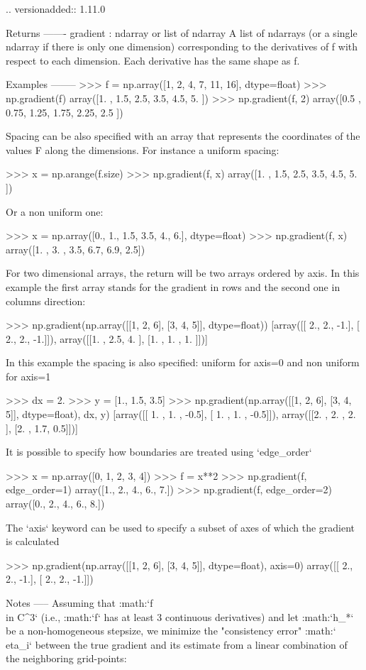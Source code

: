 \begin{DoxyVerb}
    .. versionadded:: 1.11.0

Returns
-------
gradient : ndarray or list of ndarray
    A list of ndarrays (or a single ndarray if there is only one dimension)
    corresponding to the derivatives of f with respect to each dimension.
    Each derivative has the same shape as f.

Examples
--------
>>> f = np.array([1, 2, 4, 7, 11, 16], dtype=float)
>>> np.gradient(f)
array([1. , 1.5, 2.5, 3.5, 4.5, 5. ])
>>> np.gradient(f, 2)
array([0.5 ,  0.75,  1.25,  1.75,  2.25,  2.5 ])

Spacing can be also specified with an array that represents the coordinates
of the values F along the dimensions.
For instance a uniform spacing:

>>> x = np.arange(f.size)
>>> np.gradient(f, x)
array([1. ,  1.5,  2.5,  3.5,  4.5,  5. ])

Or a non uniform one:

>>> x = np.array([0., 1., 1.5, 3.5, 4., 6.], dtype=float)
>>> np.gradient(f, x)
array([1. ,  3. ,  3.5,  6.7,  6.9,  2.5])

For two dimensional arrays, the return will be two arrays ordered by
axis. In this example the first array stands for the gradient in
rows and the second one in columns direction:

>>> np.gradient(np.array([[1, 2, 6], [3, 4, 5]], dtype=float))
[array([[ 2.,  2., -1.],
       [ 2.,  2., -1.]]), array([[1. , 2.5, 4. ],
       [1. , 1. , 1. ]])]

In this example the spacing is also specified:
uniform for axis=0 and non uniform for axis=1

>>> dx = 2.
>>> y = [1., 1.5, 3.5]
>>> np.gradient(np.array([[1, 2, 6], [3, 4, 5]], dtype=float), dx, y)
[array([[ 1. ,  1. , -0.5],
       [ 1. ,  1. , -0.5]]), array([[2. , 2. , 2. ],
       [2. , 1.7, 0.5]])]

It is possible to specify how boundaries are treated using `edge_order`

>>> x = np.array([0, 1, 2, 3, 4])
>>> f = x**2
>>> np.gradient(f, edge_order=1)
array([1.,  2.,  4.,  6.,  7.])
>>> np.gradient(f, edge_order=2)
array([0., 2., 4., 6., 8.])

The `axis` keyword can be used to specify a subset of axes of which the
gradient is calculated

>>> np.gradient(np.array([[1, 2, 6], [3, 4, 5]], dtype=float), axis=0)
array([[ 2.,  2., -1.],
       [ 2.,  2., -1.]])

Notes
-----
Assuming that :math:`f\\in C^{3}` (i.e., :math:`f` has at least 3 continuous
derivatives) and let :math:`h_{*}` be a non-homogeneous stepsize, we
minimize the "consistency error" :math:`\\eta_{i}` between the true gradient
and its estimate from a linear combination of the neighboring grid-points:


\end{DoxyVerb}
